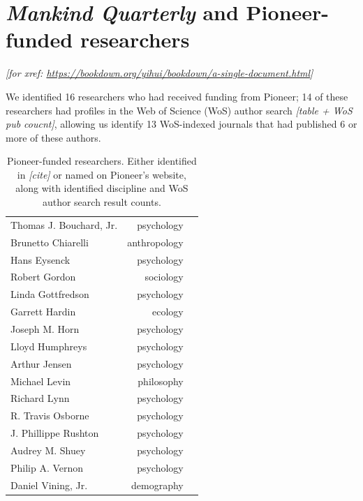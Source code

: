 \documentclass[12pt]{article}
\begin{document}
\hypertarget{mankind-quarterly-and-pioneer-funded-researchers}{%
\section*{\texorpdfstring{\emph{Mankind Quarterly} and Pioneer-funded
researchers}{Mankind Quarterly and Pioneer-funded researchers}}\label{mankind-quarterly-and-pioneer-funded-researchers}}

\emph{{[}for xref:
\url{https://bookdown.org/yihui/bookdown/a-single-document.html}{]}}

We identified 16 researchers who had received funding from Pioneer; 14
of these researchers had profiles in the Web of Science (WoS) author
search \emph{{[}table + WoS pub coucnt{]}}, allowing us identify 13
WoS-indexed journals that had published 6 or more of these authors.

\begin{longtable}[]{@{}lrl@{}}
\caption{Pioneer-funded researchers. Either identified in
\emph{{[}cite{]}} or named on Pioneer's website, along with identified
discipline and WoS author search result counts.}\tabularnewline
\toprule
\endhead
Thomas J. Bouchard, Jr. & psychology & \\
Brunetto Chiarelli & anthropology & \\
Hans Eysenck & psychology & \\
Robert Gordon & sociology & \\
Linda Gottfredson & psychology & \\
Garrett Hardin & ecology & \\
Joseph M. Horn & psychology & \\
Lloyd Humphreys & psychology & \\
Arthur Jensen & psychology & \\
Michael Levin & philosophy & \\
Richard Lynn & psychology & \\
R. Travis Osborne & psychology & \\
J. Phillippe Rushton & psychology & \\
Audrey M. Shuey & psychology & \\
Philip A. Vernon & psychology & \\
Daniel Vining, Jr. & demography & \\
\bottomrule
\end{longtable}
\end{document}
